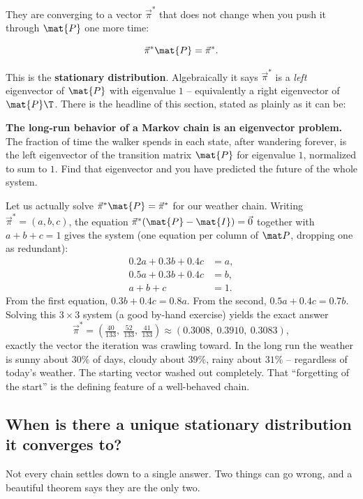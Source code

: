 They are converging to a vector $\vec\pi^\ast$ that does not
change when you push it through $\mat{P}$ one more time:

\[
\vec\pi^\ast \mat{P} = \vec\pi^\ast.
\]

This is the \textbf{stationary distribution}. Algebraically it says $\vec\pi^\ast$ is a
\emph{left} eigenvector of $\mat{P}$ with eigenvalue $1$ -- equivalently a right eigenvector
of $\mat{P}\T$. There is the headline of this section, stated as plainly as it can be:

\begin{focusbox}
\textbf{The long-run behavior of a Markov chain is an eigenvector problem.} The fraction of
time the walker spends in each state, after wandering forever, is the left eigenvector of
the transition matrix $\mat{P}$ for eigenvalue $1$, normalized to sum to $1$. Find that
eigenvector and you have predicted the future of the whole system.
\end{focusbox}

Let us actually solve $\vec\pi^\ast\mat{P} = \vec\pi^\ast$ for our weather chain. Writing
$\vec\pi^\ast = (a,b,c)$, the equation $\vec\pi^\ast(\mat{P}-\mat{I}) = \vec0$ together with
$a+b+c=1$ gives the system (one equation per column of $\mat P$, dropping one as
redundant):
\[
\begin{aligned}
0.2a + 0.3b + 0.4c &= a,\\
0.5a + 0.3b + 0.4c &= b,\\
a + b + c &= 1.
\end{aligned}
\]
From the first equation, $0.3b + 0.4c = 0.8a$. From the second,
$0.5a + 0.4c = 0.7b$. Solving this $3\times3$ system (a good by-hand exercise) yields the
exact answer
\[
\vec\pi^\ast = \left(\tfrac{40}{133},\ \tfrac{52}{133},\ \tfrac{41}{133}\right)
\approx (0.3008,\ 0.3910,\ 0.3083),
\]
exactly the vector the iteration was crawling toward. In the long run the weather is sunny
about $30\%$ of days, cloudy about $39\%$, rainy about $31\%$ -- regardless of today's
weather. The starting vector washed out completely. That ``forgetting of the start'' is the
defining feature of a well-behaved chain.

\subsection{When is there a unique stationary distribution it converges to?}

Not every chain settles down to a single answer. Two things can go wrong, and a beautiful
theorem says they are the only two.

